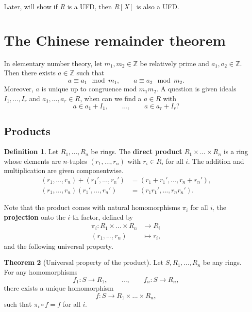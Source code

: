 \documentclass{article}
\newcommand{\Z}{\mathbb{Z}}
\newcommand{\rb}[1]{\left( #1 \right)}
\renewcommand{\sb}[1]{\left[ #1 \right]}
\theoremstyle{definition}\newtheorem{definition}{Definition}[subsection]
\theoremstyle{definition}\newtheorem{remark}[definition]{Remark}
\theoremstyle{definition}\newtheorem*{example}{Example}
\theoremstyle{definition}\newtheorem*{note}{Note}
\newtheorem{theorem}[definition]{Theorem}
\begin{document}
Later, will show if $ R $ is a UFD, then $ R\sb{X} $ is also a UFD.

\pagebreak

\section{The Chinese remainder theorem}

In elementary number theory, let $ m_1, m_2 \in \Z $ be relatively prime and $ a_1, a_2 \in \Z $. Then there exists $ a \in \Z $ such that
$$ a \equiv a_1 \mod m_1, \qquad a \equiv a_2 \mod m_2. $$
Moreover, $ a $ is unique up to congruence mod $ m_1m_2 $. A question is given ideals $ I_1, \dots, I_r $ and $ a_1, \dots, a_r \in R $, when can we find a $ a \in R $ with
$$ a \in a_1 + I_1, \qquad \dots, \qquad a \in a_r + I_r? $$

\subsection{Products}

\begin{definition}
Let $ R_1, \dots, R_n $ be rings. The \textbf{direct product} $ R_1 \times \dots \times R_n $ is a ring whose elements are $ n $-tuples $ \rb{r_1, \dots, r_n} $ with $ r_i \in R_i $ for all $ i $. The addition and multiplication are given componentwise.
\begin{align*}
\rb{r_1, \dots, r_n} + \rb{r_1', \dots, r_n'} & = \rb{r_1 + r_1', \dots, r_n + r_n'}, \\
\rb{r_1, \dots, r_n}\rb{r_1', \dots, r_n'} & = \rb{r_1r_1', \dots, r_nr_n'}.
\end{align*}
\end{definition}

Note that the product comes with natural homomorphisms $ \pi_i $ for all $ i $, the \textbf{projection} onto the $ i $-th factor, defined by
\begin{align*}
\pi_i : R_1 \times \dots \times R_n & \to R_i \\
\rb{r_1, \dots, r_n} & \mapsto r_i,
\end{align*}
and the following universal property.

\begin{theorem}[Universal property of the product]
Let $ S, R_1, \dots, R_n $ be any rings. For any homomorphisms
$$ f_1 : S \to R_1, \qquad \dots, \qquad f_n : S \to R_n, $$
there exists a unique homomorphism
$$ f : S \to R_1 \times \dots \times R_n, $$
such that $ \pi_i \circ f = f $ for all $ i $.
\end{theorem}
\end{document}
